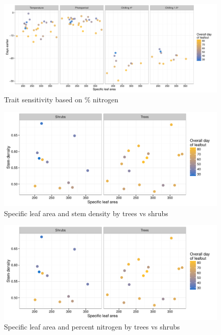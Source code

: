 \documentclass{article}
\begin{document}
\begin{figure}
\caption{Trait sensitivity based on \% nitrogen}
\label{figS7}
\includegraphics[scale=0.95, page=3]{Traits_vs_sensitivity}
\end{figure}


\begin{figure}
\caption{Specific leaf area and stem density by trees vs shrubs}
\label{figS8}
\includegraphics[scale=0.95, page=1]{Tree_shrub_traits}
\end{figure}


\begin{figure}
\caption{Specific leaf area and percent nitrogen by trees vs shrubs}
\label{figS9}
\includegraphics[scale=0.95, page=2]{Tree_shrub_traits}
\end{figure}
\end{document}
